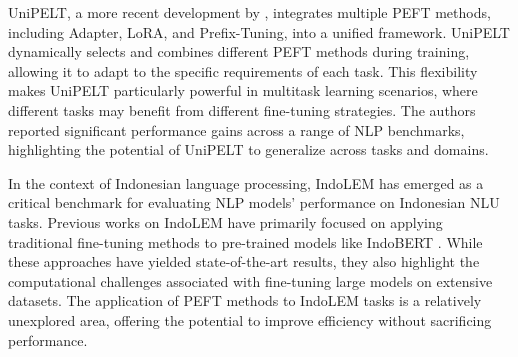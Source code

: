 UniPELT, a more recent development by \citeauthor{unipelt} \cite{unipelt}, integrates multiple PEFT methods, including Adapter, LoRA, and Prefix-Tuning, into a unified framework. UniPELT dynamically selects and combines different PEFT methods during training, allowing it to adapt to the specific requirements of each task. This flexibility makes UniPELT particularly powerful in multitask learning scenarios, where different tasks may benefit from different fine-tuning strategies. The authors reported significant performance gains across a range of NLP benchmarks, highlighting the potential of UniPELT to generalize across tasks and domains.

In the context of Indonesian language processing, IndoLEM \cite{indolem} has emerged as a critical benchmark for evaluating NLP models' performance on Indonesian NLU tasks. Previous works on IndoLEM have primarily focused on applying traditional fine-tuning methods to pre-trained models like IndoBERT \cite{indolem}. While these approaches have yielded state-of-the-art results, they also highlight the computational challenges associated with fine-tuning large models on extensive datasets. The application of PEFT methods to IndoLEM tasks is a relatively unexplored area, offering the potential to improve efficiency without sacrificing performance.

